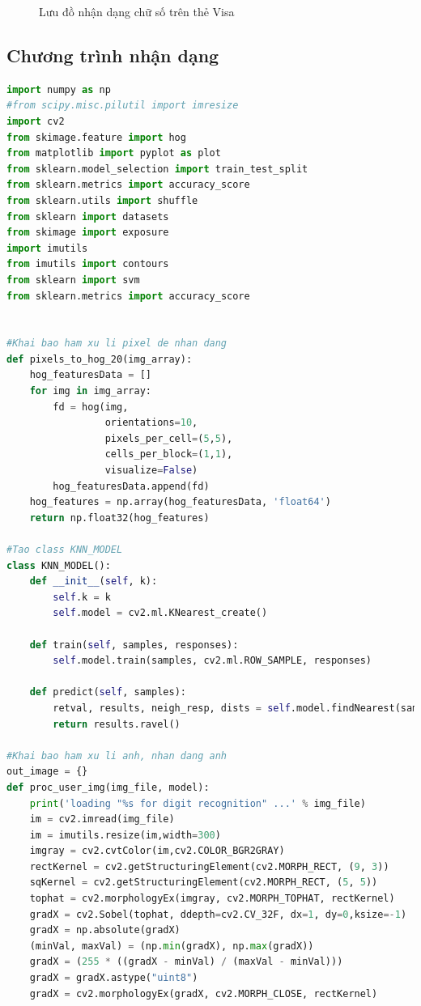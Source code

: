 \begin{figure}[htp]
    \caption{Lưu đồ nhận dạng chữ số trên thẻ Visa}
\end{figure}

\subsection{Chương trình nhận dạng}

\begin{lstlisting}[language=Python, caption=Recognition American Express]
import numpy as np
#from scipy.misc.pilutil import imresize
import cv2 
from skimage.feature import hog
from matplotlib import pyplot as plot
from sklearn.model_selection import train_test_split
from sklearn.metrics import accuracy_score
from sklearn.utils import shuffle
from sklearn import datasets
from skimage import exposure
import imutils
from imutils import contours
from sklearn import svm
from sklearn.metrics import accuracy_score


#Khai bao ham xu li pixel de nhan dang
def pixels_to_hog_20(img_array):
    hog_featuresData = []
    for img in img_array:
        fd = hog(img, 
                 orientations=10, 
                 pixels_per_cell=(5,5),
                 cells_per_block=(1,1), 
                 visualize=False)
        hog_featuresData.append(fd)
    hog_features = np.array(hog_featuresData, 'float64')
    return np.float32(hog_features)

#Tao class KNN_MODEL
class KNN_MODEL():
    def __init__(self, k):
        self.k = k
        self.model = cv2.ml.KNearest_create()

    def train(self, samples, responses):
        self.model.train(samples, cv2.ml.ROW_SAMPLE, responses)

    def predict(self, samples):
        retval, results, neigh_resp, dists = self.model.findNearest(samples, self.k)
        return results.ravel()
    
#Khai bao ham xu li anh, nhan dang anh
out_image = {}
def proc_user_img(img_file, model):
    print('loading "%s for digit recognition" ...' % img_file)
    im = cv2.imread(img_file)  
    im = imutils.resize(im,width=300)  
    imgray = cv2.cvtColor(im,cv2.COLOR_BGR2GRAY)
    rectKernel = cv2.getStructuringElement(cv2.MORPH_RECT, (9, 3))
    sqKernel = cv2.getStructuringElement(cv2.MORPH_RECT, (5, 5))
    tophat = cv2.morphologyEx(imgray, cv2.MORPH_TOPHAT, rectKernel)
    gradX = cv2.Sobel(tophat, ddepth=cv2.CV_32F, dx=1, dy=0,ksize=-1)
    gradX = np.absolute(gradX)
    (minVal, maxVal) = (np.min(gradX), np.max(gradX))
    gradX = (255 * ((gradX - minVal) / (maxVal - minVal)))
    gradX = gradX.astype("uint8")
    gradX = cv2.morphologyEx(gradX, cv2.MORPH_CLOSE, rectKernel)
    

\end{lstlisting}
